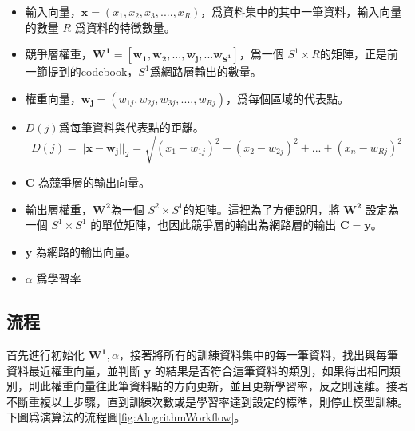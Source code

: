 \begin{itemize}
	\item
	      輸入向量，\(\mathbf{x} = (x_1,x_2,x_3,....,x_R)\)，爲資料集中的其中一筆資料，輸入向量的數量 \(R\) 爲資料的特徵數量。


	\item
		競爭層權重，\(\mathbf{W^1} = [\mathbf{w_1,w_2,...,w_j,...w_{S^1}}]\)，爲一個 \(S^1 \times R \)的矩陣，正是前一節提到的codebook，\(S^1\)爲網路層輸出的數量。
	\item
		權重向量，\(\mathbf{w_{j}} = (w_{1j},w_{2j},w_{3j},....,w_{Rj})\)，爲每個區域的代表點。

	\item
	      \(D(j)\)爲每筆資料與代表點的距離。
	      $$D(j)=||\mathbf{x}-\mathbf{w_j}||_2 = \sqrt{(x_1-w_{1j})^2+(x_2-w_{2j})^2+...+(x_n-w_{Rj})^2} $$


	\item
		\(\mathbf{C}\) 為競爭層的輸出向量。

	\item
	      輸出層權重，\(\mathbf{W^2} \)為一個 \(S^2 \times S^1\)的矩陣。這裡為了方便說明，將 \(\mathbf{W^2}\) 設定為一個 \(S^1 \times S^1\) 的單位矩陣，也因此競爭層的輸出為網路層的輸出 \(\mathbf{C} = \mathbf{y}\)。

	\item
		\(\mathbf{y}\) 為網路的輸出向量。

	\item
	      \(\alpha\) 爲學習率

\end{itemize}


\subsection{流程}

首先進行初始化 \(\mathbf{W^1},\alpha\)，接著將所有的訓練資料集中的每一筆資料，找出與每筆資料最近權重向量，並判斷 \(\mathbf{y}\) 的結果是否符合這筆資料的類別，如果得出相同類別，則此權重向量往此筆資料點的方向更新，並且更新學習率，反之則遠離。接著不斷重複以上步驟，直到訓練次數或是學習率達到設定的標準，則停止模型訓練。下圖爲演算法的流程圖\ref{fig:AlogrithmWorkflow}。


\usetikzlibrary{positioning, shapes.geometric}

